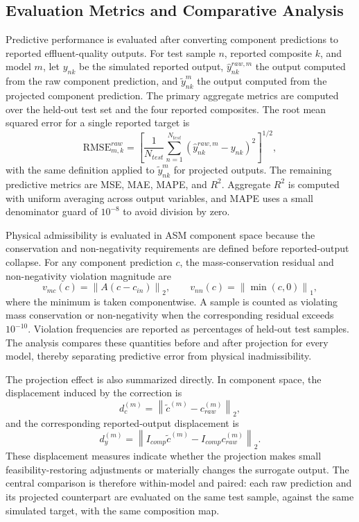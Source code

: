 \documentclass[a4paper,fleqn]{cas-sc}
\begin{document}
\subsection{Evaluation Metrics and Comparative Analysis}

Predictive performance is evaluated after converting component predictions to reported effluent-quality outputs. For test sample $n$, reported composite $k$, and model $m$, let $y_{nk}$ be the simulated reported output, $\hat{y}_{nk}^{raw,m}$ the output computed from the raw component prediction, and $\tilde{y}_{nk}^{m}$ the output computed from the projected component prediction. The primary aggregate metrics are computed over the held-out test set and the four reported composites. The root mean squared error for a single reported target is
\begin{equation}
\label{eq:rmse_metric}
\mathrm{RMSE}_{m,k}^{raw} =
\left[
\frac{1}{N_{test}}\sum_{n=1}^{N_{test}}
\left(\hat{y}_{nk}^{raw,m}-y_{nk}\right)^2
\right]^{1/2},
\end{equation}
with the same definition applied to $\tilde{y}_{nk}^{m}$ for projected outputs. The remaining predictive metrics are MSE, MAE, MAPE, and $R^2$. Aggregate $R^2$ is computed with uniform averaging across output variables, and MAPE uses a small denominator guard of $10^{-8}$ to avoid division by zero.

Physical admissibility is evaluated in ASM component space because the conservation and non-negativity requirements are defined before reported-output collapse. For any component prediction $c$, the mass-conservation residual and non-negativity violation magnitude are
\begin{equation}
\label{eq:physical_residuals}
v_{mc}(c) = \left\|A(c-c_{in})\right\|_2,
\qquad
v_{nn}(c) = \left\|\min(c,0)\right\|_1,
\end{equation}
where the minimum is taken componentwise. A sample is counted as violating mass conservation or non-negativity when the corresponding residual exceeds $10^{-10}$. Violation frequencies are reported as percentages of held-out test samples. The analysis compares these quantities before and after projection for every model, thereby separating predictive error from physical inadmissibility.

The projection effect is also summarized directly. In component space, the displacement induced by the correction is
\begin{equation}
\label{eq:component_displacement}
d_c^{(m)} =
\left\|\tilde{c}^{(m)} - c_{raw}^{(m)}\right\|_2,
\end{equation}
and the corresponding reported-output displacement is
\begin{equation}
\label{eq:reported_displacement}
d_y^{(m)} =
\left\|I_{comp}\tilde{c}^{(m)} - I_{comp}c_{raw}^{(m)}\right\|_2.
\end{equation}
These displacement measures indicate whether the projection makes small feasibility-restoring adjustments or materially changes the surrogate output. The central comparison is therefore within-model and paired: each raw prediction and its projected counterpart are evaluated on the same test sample, against the same simulated target, with the same composition map.
\end{document}
